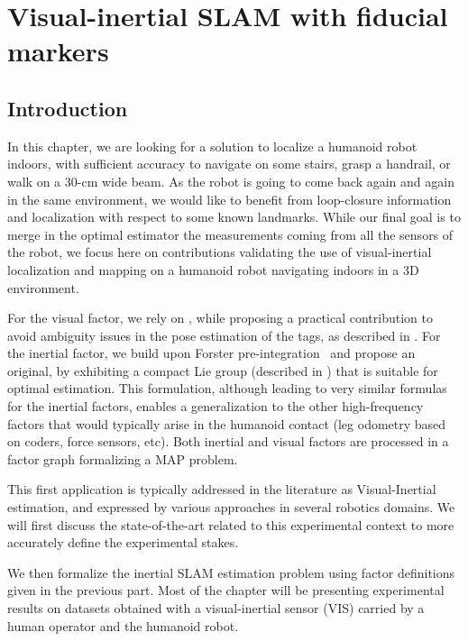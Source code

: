 \chapter{Visual-inertial SLAM with fiducial markers}
\label{chp:absolute_vi}
\minitoc
\bigskip



\section{Introduction}

In this chapter, we are looking for a solution to localize a humanoid robot indoors, with sufficient accuracy to navigate on some stairs, grasp a handrail, or 
walk on a 30-cm wide beam. 
As the robot is going to come back again and again in the same environment, we would like to benefit from loop-closure information and localization with 
respect to some known landmarks. 
While our final goal is to merge in the optimal estimator the measurements coming from all the sensors of the robot, we focus here on contributions 
validating the use of visual-inertial localization and mapping on a humanoid robot navigating indoors in a 3D environment.

For the visual factor, we rely on \apriltags \cite{wang2016iros}, while proposing a practical contribution to avoid ambiguity 
issues in the pose estimation of the tags, as described in . 
For the inertial factor, we build upon Forster pre-integration~\cite{forster2017-TRO} and propose an original, 
by exhibiting a compact Lie group (described in ) that is suitable for optimal estimation. 
This formulation, although leading to very similar formulas for the inertial factors, enables a generalization to the other high-frequency factors 
that would typically arise in the humanoid contact (leg odometry based on coders, force sensors, etc).
Both inertial and visual factors are processed in a factor graph formalizing a MAP problem.

This first application is typically addressed in the literature as Visual-Inertial estimation, and expressed by various approaches in several robotics domains.
We will first discuss the state-of-the-art related to this experimental context to more accurately define the experimental stakes.

We then formalize the inertial SLAM estimation problem using factor definitions given in the previous part. 
Most of the chapter will be presenting experimental results on datasets obtained
with a visual-inertial sensor (VIS) carried by a human operator and the  humanoid robot. 



